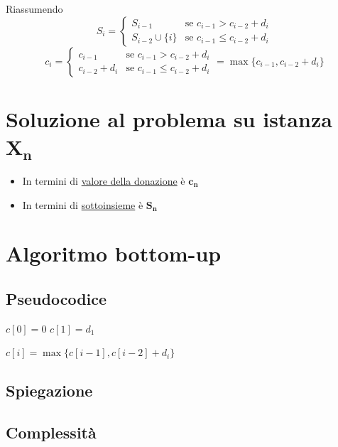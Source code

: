 Riassumendo
{
    \large
    $$
        S_i = 
        \begin{cases}
            S_{i-1} & \text{se } c_{i-1} > c_{i-2} + d_i \\
            S_{i-2} \cup \{i\} & \text{se } c_{i-1} \leq c_{i-2} + d_i
        \end{cases}
    $$
    $$
        c_i = 
        \begin{cases}
            c_{i-1} & \text{se } c_{i-1} > c_{i-2} + d_i \\
            c_{i-2} + d_i & \text{se } c_{i-1} \leq c_{i-2} + d_i
        \end{cases}
        =
        \max\{c_{i-1},c_{i-2} + d_i\}
    $$
}

\section{Soluzione al problema su istanza $\mathbf{X_n}$}
\begin{itemize}
    \item In termini di \uline{valore della donazione} è $\mathbf{c_n}$
    \item In termini di \uline{sottoinsieme} è $\mathbf{S_n}$
\end{itemize}

\section{Algoritmo bottom-up}
\subsection{Pseudocodice}
\begin{algorithm}
    \begin{algorithmic}
            \State $c[0]=0$
            \State $c[1] = d_1$

                \State $c[i] = \max\{c[i-1], c[i-2]+d_i\}$
            \EndFor
        \EndProcedure
    \end{algorithmic}
\end{algorithm}
\subsection{Spiegazione}

\subsection{Complessità}

